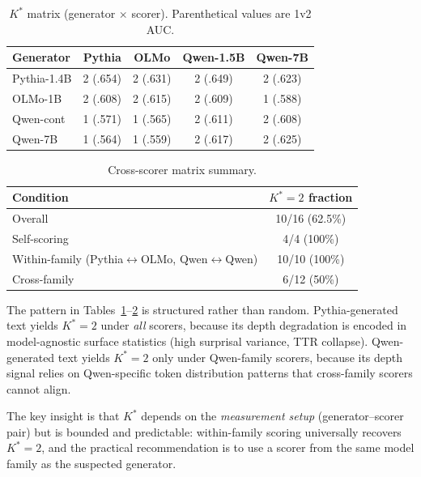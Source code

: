 \documentclass[11pt,a4paper]{article}
\newcommand{\kstar}{K^{*}}
\begin{document}
\begin{table}[t]
\centering
\small
\caption{$\kstar$ matrix (generator $\times$ scorer). Parenthetical values are 1v2 AUC.}
\label{tab:cross_scorer}
\begin{tabular}{lcccc}
\toprule
\textbf{Generator} & \textbf{Pythia} & \textbf{OLMo} & \textbf{Qwen-1.5B} & \textbf{Qwen-7B} \\
\midrule
Pythia-1.4B & 2 (.654) & 2 (.631) & 2 (.649) & 2 (.623) \\
OLMo-1B    & 2 (.608) & 2 (.615) & 2 (.609) & 1 (.588) \\
Qwen-cont  & 1 (.571) & 1 (.565) & 2 (.611) & 2 (.608) \\
Qwen-7B    & 1 (.564) & 1 (.559) & 2 (.617) & 2 (.625) \\
\bottomrule
\end{tabular}
\end{table}

\begin{table}[t]
\centering
\small
\caption{Cross-scorer matrix summary.}
\label{tab:cross_scorer_summary}
\begin{tabular}{lc}
\toprule
Condition & $\kstar = 2$ fraction \\
\midrule
Overall & 10/16 (62.5\%) \\
Self-scoring & 4/4 (100\%) \\
Within-family (Pythia$\leftrightarrow$OLMo, Qwen$\leftrightarrow$Qwen) & 10/10 (100\%) \\
Cross-family & 6/12 (50\%) \\
\bottomrule
\end{tabular}
\end{table}

The pattern in Tables~\ref{tab:cross_scorer}--\ref{tab:cross_scorer_summary} is structured rather than random.
Pythia-generated text yields $\kstar = 2$ under \emph{all} scorers, because its depth degradation is encoded in model-agnostic surface statistics (high surprisal variance, TTR collapse).
Qwen-generated text yields $\kstar = 2$ only under Qwen-family scorers, because its depth signal relies on Qwen-specific token distribution patterns that cross-family scorers cannot align.

The key insight is that $\kstar$ depends on the \emph{measurement setup} (generator--scorer pair) but is bounded and predictable: within-family scoring universally recovers $\kstar = 2$, and the practical recommendation is to use a scorer from the same model family as the suspected generator.
\end{document}
